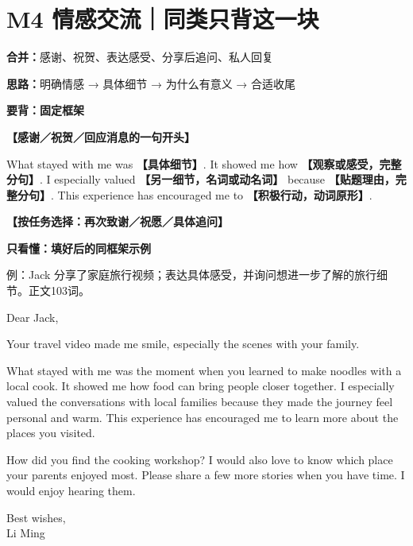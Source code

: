 \documentclass[11pt,a4paper,fontset=macnew]{ctexart}
\newenvironment{english}{\begingroup\fontsize{11}{15}\selectfont\setlength{\parskip}{4pt}}{\par\endgroup}
\newenvironment{example}{\begingroup\fontsize{10.5}{14}\selectfont\setlength{\parskip}{4pt}}{\par\endgroup}
\begin{document}
\clearpage\section*{M4 情感交流｜同类只背这一块}
{\small\textbf{合并：}感谢、祝贺、表达感受、分享后追问、私人回复\par\textbf{思路：}明确情感 → 具体细节 → 为什么有意义 → 合适收尾}\par
\par\vspace{5pt}\noindent\textbf{要背：固定框架}\par\nopagebreak
\begin{english}
\textbf{【感谢／祝贺／回应消息的一句开头】}

What stayed with me was \textbf{【具体细节】}. It showed me how \textbf{【观察或感受，完整分句】}. I especially valued \textbf{【另一细节，名词或动名词】} because \textbf{【贴题理由，完整分句】}. This experience has encouraged me to \textbf{【积极行动，动词原形】}.

\textbf{【按任务选择：再次致谢／祝愿／具体追问】}

\end{english}
\par\vspace{5pt}\noindent\textbf{只看懂：填好后的同框架示例}\par\nopagebreak
{\small 例：Jack 分享了家庭旅行视频；表达具体感受，并询问想进一步了解的旅行细节。\quad 正文103词。}\par
\begin{example}
Dear Jack,\par
Your travel video made me smile, especially the scenes with your family.

What stayed with me was the moment when you learned to make noodles with a local cook. It showed me how food can bring people closer together. I especially valued the conversations with local families because they made the journey feel personal and warm. This experience has encouraged me to learn more about the places you visited.

How did you find the cooking workshop? I would also love to know which place your parents enjoyed most. Please share a few more stories when you have time. I would enjoy hearing them.

Best wishes,\\Li Ming\par
\end{example}
\end{document}
